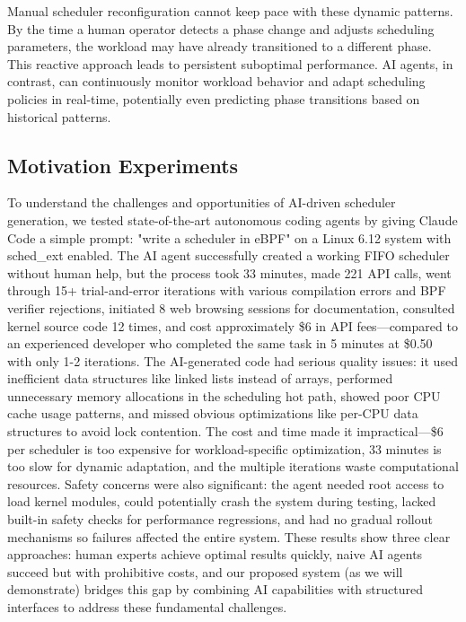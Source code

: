 Manual scheduler reconfiguration cannot keep pace with these dynamic patterns. By the time a human operator detects a phase change and adjusts scheduling parameters, the workload may have already transitioned to a different phase. This reactive approach leads to persistent suboptimal performance. AI agents, in contrast, can continuously monitor workload behavior and adapt scheduling policies in real-time, potentially even predicting phase transitions based on historical patterns.

\subsection{Motivation Experiments}

To understand the challenges and opportunities of AI-driven scheduler generation, we tested state-of-the-art autonomous coding agents by giving Claude Code a simple prompt: "write a scheduler in eBPF" on a Linux 6.12 system with sched\_ext enabled. The AI agent successfully created a working FIFO scheduler without human help, but the process took 33 minutes, made 221 API calls, went through 15+ trial-and-error iterations with various compilation errors and BPF verifier rejections, initiated 8 web browsing sessions for documentation, consulted kernel source code 12 times, and cost approximately \$6 in API fees—compared to an experienced developer who completed the same task in 5 minutes at \$0.50 with only 1-2 iterations. The AI-generated code had serious quality issues: it used inefficient data structures like linked lists instead of arrays, performed unnecessary memory allocations in the scheduling hot path, showed poor CPU cache usage patterns, and missed obvious optimizations like per-CPU data structures to avoid lock contention. The cost and time made it impractical—\$6 per scheduler is too expensive for workload-specific optimization, 33 minutes is too slow for dynamic adaptation, and the multiple iterations waste computational resources. Safety concerns were also significant: the agent needed root access to load kernel modules, could potentially crash the system during testing, lacked built-in safety checks for performance regressions, and had no gradual rollout mechanisms so failures affected the entire system. These results show three clear approaches: human experts achieve optimal results quickly, naive AI agents succeed but with prohibitive costs, and our proposed system (as we will demonstrate) bridges this gap by combining AI capabilities with structured interfaces to address these fundamental challenges.

